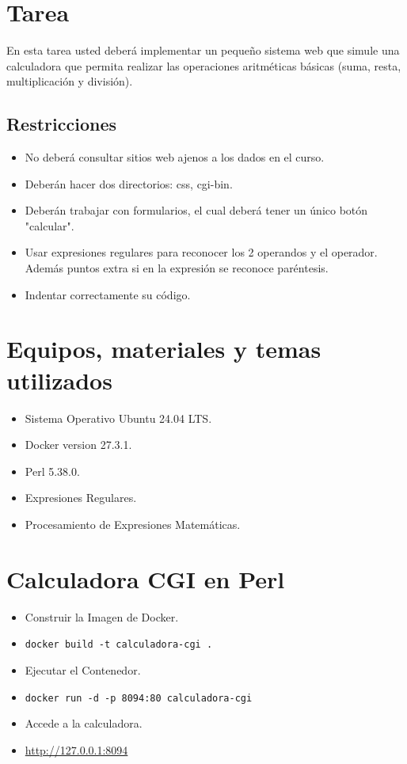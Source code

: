 \documentclass{article}
\begin{document}
	\section{Tarea}
En esta tarea usted deberá implementar un pequeño sistema web que simule            una calculadora que permita realizar las operaciones aritméticas básicas (suma, resta, multiplicación y división). 
        \subsection{Restricciones}
	\begin{itemize}		
		\item No deberá consultar sitios web ajenos a los dados en el curso.
		\item Deberán hacer dos directorios: css, cgi-bin.
		\item Deberán trabajar con formularios, el cual deberá tener un único botón "calcular".
  \item Usar expresiones regulares para reconocer los 2 operandos y el operador.  Además puntos extra si en la expresión se reconoce paréntesis.
  \item Indentar correctamente su código.

	\end{itemize}
		
	\section{Equipos, materiales y temas utilizados}
	\begin{itemize}
		\item Sistema Operativo Ubuntu 24.04 LTS.
		\item Docker version 27.3.1.
		\item Perl 5.38.0.
		\item Expresiones Regulares.
		\item Procesamiento de Expresiones Matemáticas.
	\end{itemize}
	
	\section{ Calculadora CGI en Perl}
	\begin{itemize}
		\item Construir la Imagen de Docker.
		\item \texttt{docker build -t calculadora-cgi .}
		\item Ejecutar el Contenedor.
		\item \texttt{docker run -d -p 8094:80 calculadora-cgi}
  \item Accede a la calculadora.
  \item \url{ http://127.0.0.1:8094}
	\end{itemize}
	
\end{document}
